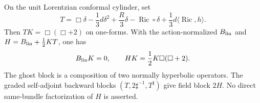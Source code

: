 \begin{theorem}
On the unit Lorentzian conformal cylinder, set
\[T=\Box\delta-\frac13d\delta^2+\frac R3\delta
-\operatorname{Ric}\circ\delta+\frac13d\langle\operatorname{Ric},h\rangle.\]
Then $TK=\Box(\Box+2)$ on one-forms.  With the
action-normalized $B_{\rm lin}$ and
$H=B_{\rm lin}+\frac12KT$, one has
\[B_{\rm lin}K=0,\qquad HK=\frac12K\Box(\Box+2).\]
The ghost block is a composition of two normally hyperbolic
operators.  The graded self-adjoint backward blocks
$(T,2\sharp^{-1},T^\sharp)$ give field block $2H$.
No direct same-bundle factorization of $H$ is asserted.
\end{theorem}
